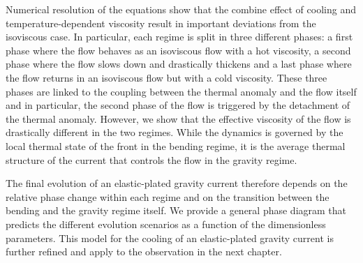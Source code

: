 Numerical resolution of the equations  show that the combine effect of
cooling  and  temperature-dependent   viscosity  result  in  important
deviations from  the isoviscous case.   In particular, each  regime is
split in three different phases: a  first phase where the flow behaves
as an isoviscous  flow with a hot viscosity, a  second phase where the
flow slows  down and drastically thickens  and a last phase  where the
flow returns in  an isoviscous flow but with a  cold viscosity.  These
three phases  are linked to  the coupling between the  thermal anomaly
and the flow itself and in particular, the second phase of the flow is
triggered by the detachment of  the thermal anomaly.  However, we show
that the effective  viscosity of the flow is  drastically different in
the two regimes.  While the dynamics  is governed by the local thermal
state of  the front in the  bending regime, it is  the average thermal
structure of the current that controls the flow in the gravity regime.

The  final evolution  of an  elastic-plated gravity  current therefore
depends on  the relative phase  change within  each regime and  on the
transition  between the  bending and  the gravity  regime itself.   We
provide a general phase diagram  that predicts the different evolution
scenarios as a  function of the dimensionless  parameters.  This model
for  the  cooling of  an  elastic-plated  gravity current  is  further
refined and apply to the observation in the next chapter.


